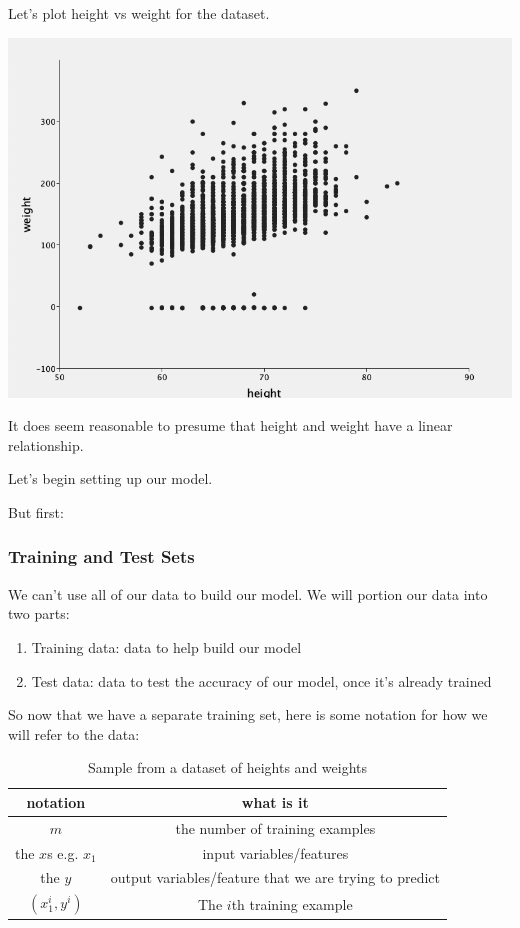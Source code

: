 \documentclass[12pt]{article}
\begin{document}
Let's plot height vs weight for the dataset.

\includegraphics[width={\textwidth}]{height-weight}

It does seem reasonable to presume that height and weight have a linear relationship. 

Let's begin setting up our model.

But first: 

\subsubsection{Training and Test Sets}

We can't use all of our data to build our model. We will portion our data into two parts: 

\begin{enumerate}
\item Training data: data to help build our model
\item Test data: data to test the accuracy of our model, once it's already trained
\end{enumerate}

So now that we have a separate training set, here is some notation for how we will refer to the data:
\begin{table}[htp]
\caption{Sample from a dataset of heights and weights}
\begin{center}
\begin{tabular}{|c|c|}
\hline
notation & what is it \\ \hline
$m$ & the number of training examples \\
the $x$s e.g. $x_1$ & input variables/features \\ 
the $y$ & output variables/feature that we are trying to predict \\ 
$(x_1^i, y^i)$ & The $i$th training example  \\ 
\hline
\end{tabular}
\end{center}
\label{table:sample-table-notaton}
\end{table}%
\end{document}
